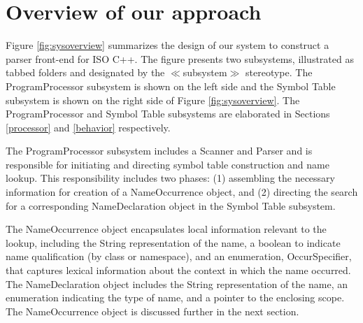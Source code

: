 \section{Overview of our approach}

Figure \ref{fig:sysoverview} summarizes the design of
our system to construct a parser front-end for ISO C++.
The figure presents two subsystems, illustrated as
tabbed folders and designated by the $\ll${\sf subsystem}$\gg$ stereotype.
The {\sf ProgramProcessor} subsystem is shown on
the left side and the {\sf Symbol Table} subsystem is shown
on the right side of Figure \ref{fig:sysoverview}. 
The {\sf ProgramProcessor} and {\sf Symbol Table}
subsystems are elaborated in Sections \ref{processor}
and \ref{behavior} respectively.

The {\sf ProgramProcessor} subsystem includes a {\sf Scanner}
and {\sf Parser} and is responsible for initiating and
directing symbol table construction and name lookup.
This responsibility includes two phases: (1) assembling
the necessary information for creation of a {\sf NameOccurrence}
object, and (2) directing the search for a corresponding
{\sf NameDeclaration} object in the {\sf Symbol Table} subsystem.

The {\sf NameOccurrence} object encapsulates local information
relevant to the lookup, including the {\sf String}
representation of the name, a boolean to indicate
name qualification (by class or namespace), and
an enumeration, {\sf OccurSpecifier}, that
captures lexical information about the context
in which the name occurred. 
The {\sf NameDeclaration} object includes the
{\sf String} representation of the name,
an enumeration indicating the type of name,
and a pointer to the enclosing scope.
The {\sf NameOccurrence}
object is discussed further in the next section.



